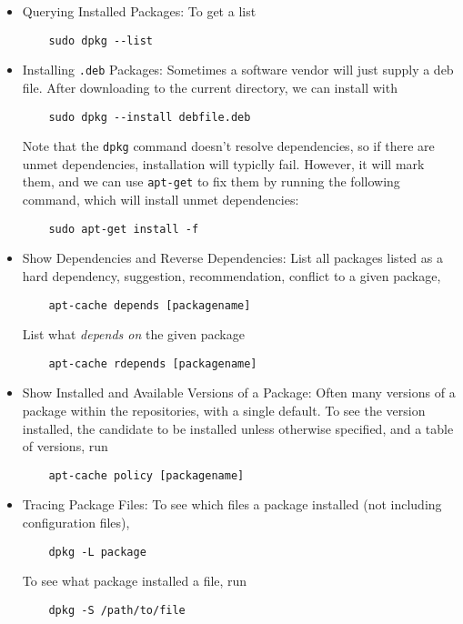 \documentclass[12pt]{article}
\theoremstyle{plain}
\theoremstyle{definition}
\theoremstyle{remark}
\begin{document}
\begin{itemize}
  \item Querying Installed Packages:
    To get a list
    \begin{lstlisting}
    sudo dpkg --list
    \end{lstlisting}

  \item Installing \texttt{.deb} Packages:
    Sometimes a software vendor will just supply a deb file.
    After downloading to the current directory, we can install with
    \begin{lstlisting}
    sudo dpkg --install debfile.deb
    \end{lstlisting}
    Note that the \texttt{dpkg} command doesn't resolve dependencies, so
    if there are unmet dependencies, installation will typiclly fail.
    However, it will mark them, and we can use \texttt{apt-get} to fix
    them by running the following command, which will install unmet
    dependencies:
    \begin{lstlisting}
    sudo apt-get install -f
    \end{lstlisting}

  \item Show Dependencies and Reverse Dependencies:
    List all packages listed as a hard dependency, suggestion,
    recommendation, conflict to a given package,
    \begin{lstlisting}
    apt-cache depends [packagename]
    \end{lstlisting}
    List what \emph{depends on} the given package
    \begin{lstlisting}
    apt-cache rdepends [packagename]
    \end{lstlisting}

  \item Show Installed and Available Versions of a Package:
    Often many versions of a package within the repositories, with a
    single default.
    To see the version installed, the candidate to be installed unless
    otherwise specified, and a table of versions, run
    \begin{lstlisting}
    apt-cache policy [packagename]
    \end{lstlisting}


  \item Tracing Package Files:
    To see which files a package installed (not including configuration
    files),
    \begin{lstlisting}
    dpkg -L package
    \end{lstlisting}
    To see what package installed a file, run
    \begin{lstlisting}
    dpkg -S /path/to/file
    \end{lstlisting}

\end{itemize}
\end{document}
